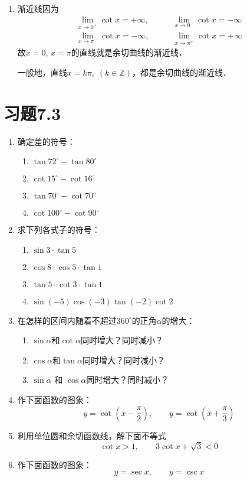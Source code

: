 \begin{enumerate}
\item 渐近线\quad 因为
\[\begin{split}
    \lim_{x\to 0^+} \cot x=+\infty,&\qquad \lim_{x\to 0^-} \cot x=-\infty\\
    \lim_{x\to \pi^-} \cot x=-\infty, &\qquad \lim_{x\to \pi^+} \cot x=+\infty
\end{split}\]
故$x=0$, $x=\pi$的直线就是余切曲线的渐近线．

一般地，直线$x=k\pi,\; (k\in\mathbb{Z})$，都是余切曲线的渐近线．

\end{enumerate}


\section*{习题7.3}

\begin{enumerate}
    \item 确定差的符号：
\begin{multicols}{2}
    \begin{enumerate}
\item $\tan 72^{\circ}-\tan 80^{\circ}$
\item $\cot 15^{\circ}-\cot 16^{\circ}$
\item $\tan 70^{\circ}-\cot 70^{\circ}$
\item $\cot 100^{\circ}-\cot 90^{\circ}$
    \end{enumerate}
\end{multicols}

\item 求下列各式子的符号：
\begin{multicols}{2}
    \begin{enumerate}
\item $\sin 3\cdot \tan 5$
\item $\cos 8\cdot \cos 5\cdot \tan 1$
\item $\tan 5\cdot \cot 3\cdot \tan 1$
\item $\sin(-5)\cos(-3)\tan(-2)\cot2$
    \end{enumerate}
\end{multicols}

\item 在怎样的区间内随着不超过$360^{\circ}$的正角$\alpha$的增大：
\begin{enumerate}
    \item $\sin\alpha$和$\cot\alpha$同时增大？同时减小？
    \item $\cos\alpha$和$\tan\alpha$同时增大？同时减小？
    \item $\sin\alpha$ 和 $\cos\alpha$同时增大？同时减小？
\end{enumerate}


\item 作下面函数的图象：
\[y=\cot\left(x-\frac{\pi}{2}\right),\qquad y=\cot\left(x+\frac{\pi}{3}\right) \]
\item 利用单位圆和余切函数线，解下面不等式
\[\cot x> 1,\qquad 3\cot x+\sqrt{3}<0\]

\item 作下面函数的图象：
\[y=\sec x,\qquad y=\csc x\]
\end{enumerate}


